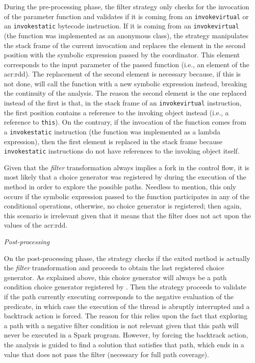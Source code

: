 During the pre-processing phase, the filter strategy only checks for the invocation of the parameter function and validates if it is coming from an \texttt{invokevirtual} or an \texttt{invokestatic} bytecode instruction. If it is coming from an \texttt{invokevirtual} (the function was implemented as an anonymous class), the strategy manipulates the stack frame of the current invocation and replaces the element in the second position with the symbolic expression passed by the coordinator. This element corresponds to the input parameter of the passed function (i.e., an element of the \acrshort{acr:rdd}). The replacement of the second element is necessary because, if this is not done, \spf{} will call the function with a new symbolic expression instead, breaking the continuity of the analysis. The reason the second element is the one replaced instead of the first is that, in the stack frame of an \texttt{invokevirtual} instruction, the first position contains a reference to the invoking object instead (i.e., a reference to \texttt{this}). On the contrary, if the invocation of the function comes from a \texttt{invokestatic} instruction (the function was implemented as a lambda expression), then the first element is replaced in the stack frame because \texttt{invokestatic} instructions do not have references to the invoking object itself.

Given that the \textit{filter} transformation always implies a fork in the control flow, it is most likely that a choice generator was registered by \spf{}
during the execution of the method in order to explore the possible paths. Needless to mention, this only occurs if the symbolic expression passed to the function participates in any of the conditional operations, otherwise, no choice generator is registered; then again, this scenario is irrelevant given that it means that the filter does not act upon the values of the \acrshort{acr:rdd}.

\textit{Post-processing}

On the post-processing phase, the strategy checks if the exited method is actually the \textit{filter} transformation and proceeds to obtain the last registered choice generator. As explained above, this choice generator will always be a path condition choice generator registered by \spf{}. Then the strategy proceeds to validate if the path currently executing corresponds to the negative evaluation of the predicate, in which case the execution of the thread is abruptly interrupted and a backtrack action is forced. The reason for this relies upon the fact that exploring a path with a negative filter condition is not relevant given that this path will never be executed in a Spark program. However, by forcing the backtrack action, the analysis is guided to find a solution that satisfies that path, which ends in a value that does not pass the filter (necessary for full path coverage).

